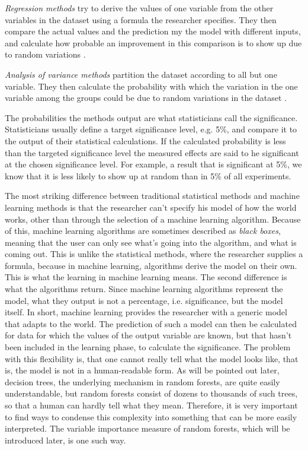 \documentclass[a4paper,man,12pt,apacite]{apa6} %
\begin{document}
\emph{Regression methods} try to derive the values of
one variable from the other variables in the dataset using a formula the
researcher specifies.
They then compare the actual values and the prediction my the model with
different inputs, and calculate how probable an improvement in this
comparison is to show up due to random variations \cite{wpRA}.

\emph{Analysis of variance methods} partition the dataset
according to all but one variable. They then calculate the probability with
which the variation in the one variable among the groups could be due to
random variations in the dataset \cite{wpAOV}.

The probabilities the methods output are what statisticians call the
significance. Statisticians usually define a target significance level,
e.g. 5\%, and compare it to the output of their statistical calculations.
If the calculated probability is less than the targeted significance level the
measured effects are said to he significant at the chosen significance level.
For example, a result that is significant at 5\%, we know that it is less
likely to show up at random than in 5\% of all experiments.

The most striking difference between traditional statistical methods and
machine learning methods is that the researcher can't specify his model of
how the world works, other than through the selection of a machine learning
algorithm.
Because of this, machine learning algorithms are sometimes described as
\emph{black boxes}, meaning that the user can only see what's going into the
algorithm, and what is coming out.
This is unlike the statistical methods, where the researcher supplies a
formula, because in machine learning, algorithms derive the model on their own.
This is what the learning in machine learning means.
The second difference is what the algorithms return.
Since machine learning algorithms represent the model, what they output is
not a percentage, i.e. significance, but the model itself.
In short, machine learning provides the researcher with a generic model
that adapts to the world.
The prediction of such a model can then be calculated for data for which
the values of the output variable are known, but that hasn't
been included in the learning phase, to calculate the significance.
The problem with this flexibility is, that one cannot really tell what the
model looks like, that is, the model is not in a human-readable form.
As will be pointed out later, decision trees, the underlying mechanism in
random forests, are quite easily understandable, but random forests
consist of dozens to thousands of such trees, so that a human can hardly
tell what they mean.
Therefore, it is very important to find ways to condense this complexity
into something that can be more easily interpreted.
The variable importance measure of random forests, which will be introduced
later, is one such way.
\end{document}
